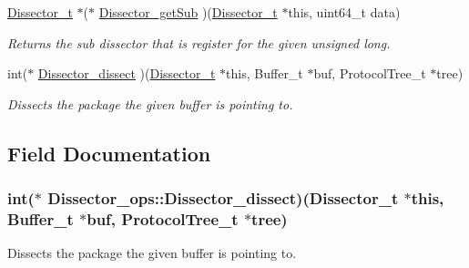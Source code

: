 \begin{DoxyCompactItemize}
\hyperlink{struct_dissector}{Dissector\-\_\-t} $\ast$($\ast$ \hyperlink{struct_dissector__ops_ae44baede5c27c672485228b01be89f4f}{Dissector\-\_\-get\-Sub} )(\hyperlink{struct_dissector}{Dissector\-\_\-t} $\ast$this, uint64\-\_\-t data)
\begin{DoxyCompactList}\small\item\em Returns the sub dissector that is register for the given unsigned long. \end{DoxyCompactList}\item 
int($\ast$ \hyperlink{struct_dissector__ops_a1a584a8476cc37171505fac4157bc2cf}{Dissector\-\_\-dissect} )(\hyperlink{struct_dissector}{Dissector\-\_\-t} $\ast$this, Buffer\-\_\-t $\ast$buf, Protocol\-Tree\-\_\-t $\ast$tree)
\begin{DoxyCompactList}\small\item\em Dissects the package the given buffer is pointing to. \end{DoxyCompactList}\end{DoxyCompactItemize}


\subsection{Field Documentation}
\hypertarget{struct_dissector__ops_a1a584a8476cc37171505fac4157bc2cf}{
\subsubsection[{Dissector\-\_\-dissect}]{\setlength{\rightskip}{0pt plus 5cm}int($\ast$ Dissector\-\_\-ops\-::\-Dissector\-\_\-dissect)({\bf Dissector\-\_\-t} $\ast$this, Buffer\-\_\-t $\ast$buf, Protocol\-Tree\-\_\-t $\ast$tree)}}\label{struct_dissector__ops_a1a584a8476cc37171505fac4157bc2cf}


Dissects the package the given buffer is pointing to. 



